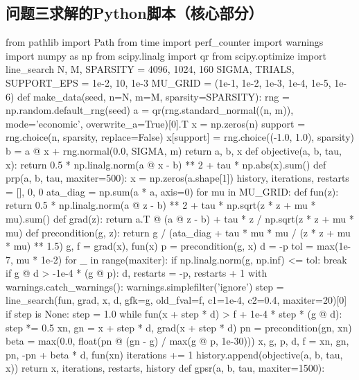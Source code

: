 \documentclass{JXUSTmodeling}
\begin{document}
\begin{appendixx}
\section{问题三求解的Python脚本（核心部分）}
\begin{python}[
	frame=single,
	breaklines=true,
	breakatwhitespace=false,
	caption={prob3\_SLSQP.py},
	label={lst:constant}
	]
from pathlib import Path
from time import perf_counter
import warnings
import numpy as np
from scipy.linalg import qr
from scipy.optimize import line_search
N, M, SPARSITY = 4096, 1024, 160
SIGMA, TRIALS, SUPPORT_EPS = 1e-2, 10, 1e-3
MU_GRID = (1e-1, 1e-2, 1e-3, 1e-4, 1e-5, 1e-6)
def make_data(seed, n=N, m=M, sparsity=SPARSITY):
    rng = np.random.default_rng(seed)
    a = qr(rng.standard_normal((n, m)), mode='economic', overwrite_a=True)[0].T
    x = np.zeros(n)
    support = rng.choice(n, sparsity, replace=False)
    x[support] = rng.choice((-1.0, 1.0), sparsity)
    b = a @ x + rng.normal(0.0, SIGMA, m)
    return a, b, x
def objective(a, b, tau, x):
    return 0.5 * np.linalg.norm(a @ x - b) ** 2 + tau * np.abs(x).sum()
def prp(a, b, tau, maxiter=500):
    x = np.zeros(a.shape[1])
    history, iterations, restarts = [], 0, 0
    ata_diag = np.sum(a * a, axis=0)
    for mu in MU_GRID:
        def fun(z):
            return 0.5 * np.linalg.norm(a @ z - b) ** 2 + tau * np.sqrt(z * z + mu * mu).sum()
        def grad(z):
            return a.T @ (a @ z - b) + tau * z / np.sqrt(z * z + mu * mu)
        def precondition(g, z):
            return g / (ata_diag + tau * mu * mu / (z * z + mu * mu) ** 1.5)
        g, f = grad(x), fun(x)
        p = precondition(g, x)
        d = -p
        tol = max(1e-7, mu * 1e-2)
        for _ in range(maxiter):
            if np.linalg.norm(g, np.inf) <= tol:
                break
            if g @ d > -1e-4 * (g @ p):
                d, restarts = -p, restarts + 1
            with warnings.catch_warnings():
                warnings.simplefilter('ignore')
                step = line_search(fun, grad, x, d, gfk=g, old_fval=f, c1=1e-4, c2=0.4, maxiter=20)[0]
            if step is None:
                step = 1.0
                while fun(x + step * d) > f + 1e-4 * step * (g @ d):
                    step *= 0.5
            xn, gn = x + step * d, grad(x + step * d)
            pn = precondition(gn, xn)
            beta = max(0.0, float(pn @ (gn - g) / max(g @ p, 1e-30)))
            x, g, p, d, f = xn, gn, pn, -pn + beta * d, fun(xn)
            iterations += 1
            history.append(objective(a, b, tau, x))
    return x, iterations, restarts, history
def gpsr(a, b, tau, maxiter=1500):

\end{python}
\end{appendixx}
\end{document}
